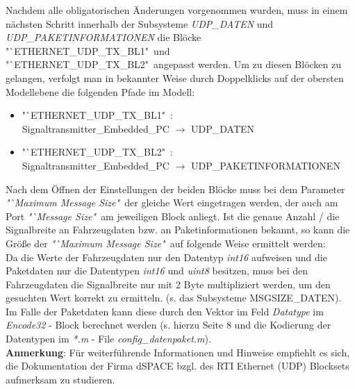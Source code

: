 \documentclass[fontsize = 12pt, paper = a4]{scrreprt}
\begin{document}
\newpage

Nachdem alle obligatorischen Änderungen vorgenommen wurden, muss in einem nächsten Schritt innerhalb der Subsysteme \textit{UDP\_DATEN} und \textit{UDP\_PAKETINFORMATIONEN} die Blöcke "`ETHERNET\_UDP\_TX\_BL1"\ und "`ETHERNET\_UDP\_TX\_BL2"\ angepasst werden. Um zu diesen Blöcken zu gelangen, verfolgt man in bekannter Weise durch Doppelklicks auf der obersten Modellebene die folgenden Pfade im Modell: 

\begin{itemize}[leftmargin=*]

\item "`ETHERNET\_UDP\_TX\_BL1"\ : \\ Signaltransmitter\_Embedded\_PC $\rightarrow$ UDP\_DATEN 

\item "`ETHERNET\_UDP\_TX\_BL2"\ : \\ Signaltransmitter\_Embedded\_PC $\rightarrow$ UDP\_PAKETINFORMATIONEN

\end{itemize}

Nach dem Öffnen der Einstellungen der beiden Blöcke muss bei dem Parameter \textit{"`Maximum Message Size"\ }der gleiche Wert eingetragen werden, der auch am Port \textit{"`Message Size"\ }am jeweiligen Block anliegt. Ist die genaue Anzahl / die Signalbreite an Fahrzeugdaten bzw. an Paketinformationen bekannt, so kann die Größe der \textit{"`Maximum Message Size"\ }auf folgende Weise ermittelt werden: \\


Da die Werte der Fahrzeugdaten nur den Datentyp \textit{int16}  aufweisen und die Paketdaten nur die Datentypen \textit{int16}  und \textit{uint8} besitzen, muss bei den Fahrzeugdaten die  Signalbreite nur mit 2 Byte multipliziert werden, um den gesuchten Wert korrekt zu ermitteln. (s. das Subsysteme MSGSIZE\_DATEN). Im Falle der Paketdaten kann diese durch den Vektor im Feld \textit{Datatype} im \textit{Encode32} - Block berechnet werden (s. hierzu Seite 8 und die Kodierung der Datentypen im \textit{*.m} - File \textit{config\_datenpaket.m}). \\  

\textbf{Anmerkung}: Für weiterführende Informationen und Hinweise empfiehlt es sich, die Dokumentation der Firma dSPACE bzgl. des RTI Ethernet (UDP) Blocksets aufmerksam zu studieren. \\

\newpage
\end{document}
